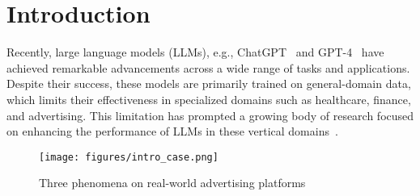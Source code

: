 \section{Introduction}
\label{sec:intro}
Recently, large language models (LLMs), e.g., ChatGPT~\cite{gpt2020} and GPT-4~\cite{OpenAI:2023ktj} have achieved remarkable advancements across a wide range of tasks and applications. Despite their success, these models are primarily trained on general-domain data, which limits their effectiveness in specialized domains such as healthcare, finance, and advertising. This limitation has prompted a growing body of research focused on enhancing the performance of LLMs in these vertical domains~\cite{moore2023empowering,harris2023large,llmRec,huang2023dsqa}.

\begin{figure}[!t]
\centering
\texttt{[image: figures/intro\_case.png]} %
\caption{Three phenomena on real-world advertising platforms}
\label{fig:discoverys}
\end{figure}



